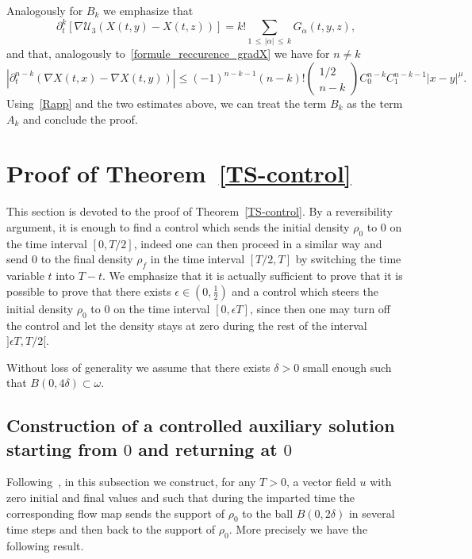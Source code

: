 \documentclass[10pt]{amsart}
\theoremstyle{definition}\newtheorem{defi}[theo]{Definition}\newtheorem{rema}[theo]{Remark}\newtheorem{exam}[theo]{Example}\newtheorem{exem}[theo]{Example}\newtheorem{nota}[theo]{Notation}
\newcommand{\clU}{\mathcal{U}}
\renewcommand{\leq}{\leqslant}
\newcommand{\eps}{\epsilon}
\begin{document}
Analogously for $B_k$ we emphasize that
\[
\partial_t^k \left[\nabla \clU_3(X(t,y)-X(t,z)) \right]=k! \underset{1\,\leq\,|\alpha|\,\leq\,k}{\sum} G_\alpha(t,y,z),
\]
and that, analogously to~\eqref{formule_reccurence_gradX} we have for $n \neq k$
\[
\left| \partial_t^{n-k}\left(\nabla X(t,x)-\nabla X(t,y)\right) \right|\leq (-1)^{n-k-1}(n-k)!
\begin{pmatrix}
1/2 \\ n-k
\end{pmatrix} C_0^{n-k} C_1^{n-k-1} |x-y|^\mu.
\]
Using~\eqref{Rapp} and the two estimates above, we can treat the term $B_k$ as the term $A_k$ and conclude the proof.



\section{Proof of Theorem~\ref{TS-control}}\label{sec-cont}
\label{sec-control}
This section is devoted to the proof of Theorem~\ref{TS-control}. By a reversibility argument, it is enough to find a control which sends the initial density $\rho_0$ to $0$ on the time interval $[0,T/2]$, indeed one can then proceed in a similar way and send $0$ to the final density $\rho_f$ in the time interval $[T/2,T]$ by switching the time variable $t$ into $T-t$. We emphasize that it is actually sufficient to prove that it is possible to prove that there exists $\eps\in (0,\frac12)$ and a control which steers the initial density $\rho_0$ to $0$ on the time interval $[0,\eps T]$, since then one may turn off the control and let the density stays at zero during the rest of the interval $]\epsilon T, T/2[$.


Without loss of generality we assume that there exists $\delta>0$ small enough such that $B(0,4\delta) \subset \omega$.



\subsection{Construction of a controlled auxiliary solution starting from \texorpdfstring{$0$}{0} and returning at \texorpdfstring{$0$}{0}}


Following~\cite{G20}, in this subsection we construct, for any $T>0$, a vector field $u$ with zero initial and final values and such that during the imparted time the corresponding flow map sends the support of $\rho_0$ to the ball $B(0,2 \delta) $ in several time steps and then back to the support of $\rho_0$. More precisely we have the following result.
\end{document}
